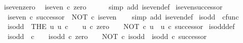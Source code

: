 \begin{isabellebody}
\isanewline
%
\endisadelimproof
\isanewline
{}\isamarkupfalse%
\ is{\isacharunderscore}{\kern0pt}even{\isacharunderscore}{\kern0pt}zero{\isacharcolon}{\kern0pt}\isanewline
\ \ {\isachardoublequoteopen}is{\isacharunderscore}{\kern0pt}even\ {\isasymcirc}\isactrlsub c\ zero\ {\isacharequal}{\kern0pt}\ {\isasymt}{\isachardoublequoteclose}\isanewline
%
\isadelimproof
\ \ %
\endisadelimproof
%
\isatagproof
{}\isamarkupfalse%
\ {\isacharparenleft}{\kern0pt}simp\ add{\isacharcolon}{\kern0pt}\ is{\isacharunderscore}{\kern0pt}even{\isacharunderscore}{\kern0pt}def{}{\isacharparenright}{\kern0pt}%
\endisatagproof
{\isafoldproof}%
%
\isadelimproof
\isanewline
%
\endisadelimproof
\isanewline
{}\isamarkupfalse%
\ is{\isacharunderscore}{\kern0pt}even{\isacharunderscore}{\kern0pt}successor{\isacharcolon}{\kern0pt}\isanewline
\ \ {\isachardoublequoteopen}is{\isacharunderscore}{\kern0pt}even\ {\isasymcirc}\isactrlsub c\ successor\ {\isacharequal}{\kern0pt}\ NOT\ {\isasymcirc}\isactrlsub c\ is{\isacharunderscore}{\kern0pt}even{\isachardoublequoteclose}\isanewline
%
\isadelimproof
\ \ %
\endisadelimproof
%
\isatagproof
{}\isamarkupfalse%
\ {\isacharparenleft}{\kern0pt}simp\ add{\isacharcolon}{\kern0pt}\ is{\isacharunderscore}{\kern0pt}even{\isacharunderscore}{\kern0pt}def{}{\isacharparenright}{\kern0pt}%
\endisatagproof
{\isafoldproof}%
%
\isadelimproof
%
\endisadelimproof
%
\isadelimdocument
%
\endisadelimdocument
%
\isatagdocument
%
\isamarkuptrue%
%
\endisatagdocument
{\isafolddocument}%
%
\isadelimdocument
%
\endisadelimdocument
{}\isamarkupfalse%
\ is{\isacharunderscore}{\kern0pt}odd\ {\isacharcolon}{\kern0pt}{\isacharcolon}{\kern0pt}\ {\isachardoublequoteopen}cfunc{\isachardoublequoteclose}\ \isanewline
\ \ {\isachardoublequoteopen}is{\isacharunderscore}{\kern0pt}odd\ {\isacharequal}{\kern0pt}\ {\isacharparenleft}{\kern0pt}THE\ u{\isachardot}{\kern0pt}\ u{\isacharcolon}{\kern0pt}\ {\isasymnat}\isactrlsub c\ {\isasymrightarrow}\ {\isasymOmega}\ {\isasymand}\ u\ {\isasymcirc}\isactrlsub c\ zero\ {\isacharequal}{\kern0pt}\ {\isasymf}\ {\isasymand}\ NOT\ {\isasymcirc}\isactrlsub c\ u\ {\isacharequal}{\kern0pt}\ u\ {\isasymcirc}\isactrlsub c\ successor{\isacharparenright}{\kern0pt}{\isachardoublequoteclose}\isanewline
\isanewline
{}\isamarkupfalse%
\ is{\isacharunderscore}{\kern0pt}odd{\isacharunderscore}{\kern0pt}def{}{\isacharcolon}{\kern0pt}\isanewline
\ \ {\isachardoublequoteopen}is{\isacharunderscore}{\kern0pt}odd\ {\isacharcolon}{\kern0pt}\ {\isasymnat}\isactrlsub c\ {\isasymrightarrow}\ {\isasymOmega}\ {\isasymand}\ is{\isacharunderscore}{\kern0pt}odd\ {\isasymcirc}\isactrlsub c\ zero\ {\isacharequal}{\kern0pt}\ {\isasymf}\ {\isasymand}\ NOT\ {\isasymcirc}\isactrlsub c\ is{\isacharunderscore}{\kern0pt}odd\ {\isacharequal}{\kern0pt}\ is{\isacharunderscore}{\kern0pt}odd\ {\isasymcirc}\isactrlsub c\ successor{\isachardoublequoteclose}\isanewline

\end{isabellebody}

